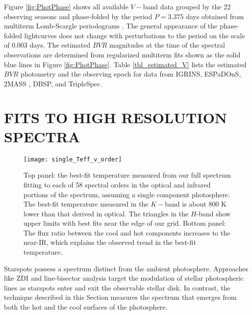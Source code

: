 \documentclass[twocolumn]{emulateapj}%
\begin{document}
Figure \ref{fig:PhotPhase} shows all available $V-$band data grouped by the 22 observing seasons and phase-folded by the period $P=3.375$ days obtained from multiterm Lomb-Scargle periodograms \citep{ivezic14}.  The general appearance of the phase-folded lightcurves does not change with perturbations to the period on the scale of 0.003 days.  The estimated $BVR$ magnitudes at the time of the spectral observations are determined from regularized multiterm fits \citep[\emph{i.e.} Fourier series truncated to the first $\sim 4$ components]{vanderplas15a} shown as the solid blue lines in Figure \ref{fig:PhotPhase}.  Table \ref{tbl_estimated_V} lists the estimated $BVR$ photometry and the observing epoch for data from IGRINS, ESPaDOnS, 2MASS \citep{skrutskie06}, DBSP, and TripleSpec.  





\section{FITS TO HIGH RESOLUTION SPECTRA}\label{sec:Starfish}

\begin{figure}
 \centering
 \texttt{[image: single\_Teff\_v\_order]}
 \caption{Top panel:  the best-fit temperature measured from our full spectrum fitting to each of 58 spectral orders in the optical and infrared portions of the spectrum,  assuming a single component photosphere.  The best-fit temperature measured in the $K-$band is about 800 K lower than that derived in optical.  The triangles in the $H$-band show upper limits with best fits near the edge of our grid.  Bottom panel:  The flux ratio between the cool and hot components increases to the near-IR, which explains the observed trend in the best-fit temperature.}
 \label{fig:SingleTeffvsOrder}
\end{figure}

Starspots possess a spectrum distinct from the ambient photosphere.  Approaches like ZDI and line-bisector analysis \citep[\emph{e.g.}][]{prato08, donati14} target the modulation of stellar photospheric lines as starspots enter and exit the observable stellar disk.  In contrast, the technique described in this Section measures the spectrum that emerges from both the hot and the cool surfaces of the photosphere.
\end{document}
